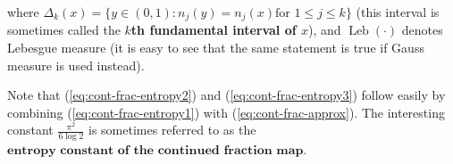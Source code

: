 \begin{enumerate}[label=\arabic*.]
\begin{thm}
\noindent where
$\Delta_k(x) = \{ y\in (0,1) : n_j(y)=n_j(x) \textrm{
for }1\le j\le k\}$
(this interval is sometimes called the \textbf{$k$th
fundamental interval of $x$}), and
$\operatorname{Leb}(\cdot)$ denotes Lebesgue measure
(it is easy to see that the same statement is true if
Gauss measure is used instead).
\end{thm}

\noindent Note that (\ref{eq:cont-frac-entropy2}) and
(\ref{eq:cont-frac-entropy3}) follow easily by combining
(\ref{eq:cont-frac-entropy1}) with
(\ref{eq:cont-frac-approx}). The interesting constant
$\frac{\pi^2}{6\log 2}$ is sometimes referred to as
the
$\textbf{entropy constant of the continued fraction
map}$.
\end{enumerate}

